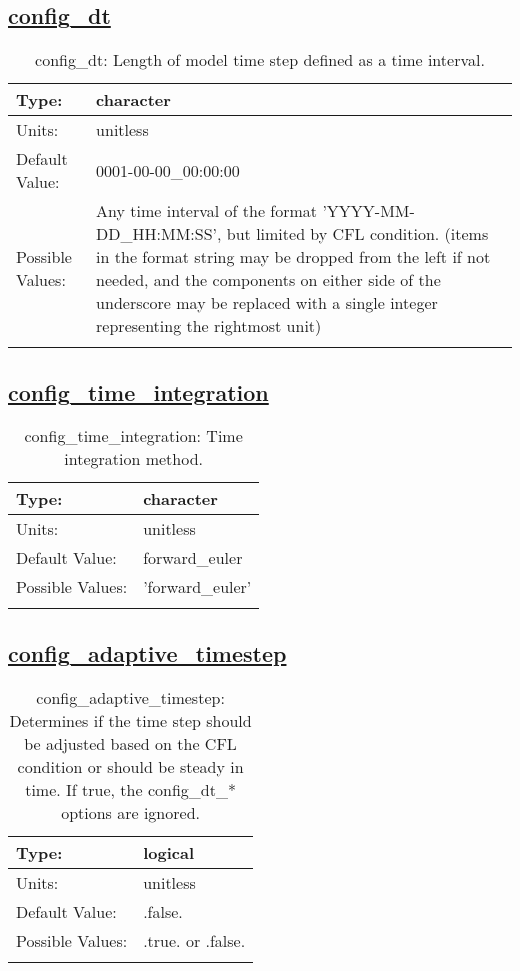 \subsection[config\_dt]{\hyperref[sec:nm_tab_time_integration]{config\_dt}}
\label{subsec:nm_sec_config_dt}
\begin{center}
\begin{longtable}{| p{2.0in} || p{4.0in} |}
    \hline
    Type: & character \\
    \hline
    Units: & \si{unitless} \\
    \hline
    Default Value: & 0001-00-00\_00:00:00 \\
    \hline
    Possible Values: & Any time interval of the format 'YYYY-MM-DD\_HH:MM:SS', but limited by CFL condition. (items in the format string may be dropped from the left if not needed, and the components on either side of the underscore may be replaced with a single integer representing the rightmost unit) \\
    \hline
    \caption{config\_dt: Length of model time step defined as a time interval.}
\end{longtable}
\end{center}
\subsection[config\_time\_integration]{\hyperref[sec:nm_tab_time_integration]{config\_time\_integration}}
\label{subsec:nm_sec_config_time_integration}
\begin{center}
\begin{longtable}{| p{2.0in} || p{4.0in} |}
    \hline
    Type: & character \\
    \hline
    Units: & \si{unitless} \\
    \hline
    Default Value: & forward\_euler \\
    \hline
    Possible Values: & 'forward\_euler' \\
    \hline
    \caption{config\_time\_integration: Time integration method.}
\end{longtable}
\end{center}
\subsection[config\_adaptive\_timestep]{\hyperref[sec:nm_tab_time_integration]{config\_adaptive\_timestep}}
\label{subsec:nm_sec_config_adaptive_timestep}
\begin{center}
\begin{longtable}{| p{2.0in} || p{4.0in} |}
    \hline
    Type: & logical \\
    \hline
    Units: & \si{unitless} \\
    \hline
    Default Value: & .false. \\
    \hline
    Possible Values: & .true. or .false. \\
    \hline
    \caption{config\_adaptive\_timestep: Determines if the time step should be adjusted based on the CFL condition or should be steady in time. If true, the config\_dt\_* options are ignored.}
\end{longtable}
\end{center}
